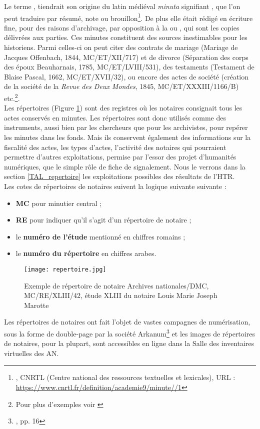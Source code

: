 Le terme , tiendrait son origine du latin médiéval \textit{minuta} signifiant , que l'on peut traduire par résumé, note ou brouillon\footnote{, CNRTL (Centre national des ressources textuelles et lexicales), URL : \url{https://www.cnrtl.fr/definition/academie9/minute//1}}. De plus elle était rédigé en écriture fine, pour des raisons d'archivage, par opposition à la  ou , qui sont les copies délivrées aux parties. Ces minutes constituent des sources inestimables pour les historiens. Parmi celles-ci on peut citer des contrats de mariage (Mariage de Jacques Offenbach, 1844, MC/ET/XII/717) et de divorce (Séparation des corps des époux Beauharnais, 1785, MC/ET/LVIII/531), des testaments (Testament de Blaise Pascal, 1662, MC/ET/XVII/32), ou encore des actes de société (création de la société de la \textit{Revue des Deux Mondes}, 1845, MC/ET/XXXIII/1166/B) etc.\footnote{Pour plus d'exemples voir \cite{limon-bonnet_122_2012}}.\\

Les répertoires (Figure \ref{fig:repertoire}) sont des registres où les notaires consignait tous les actes conservés en minutes. Les répertoires sont donc utilisés comme des instruments, aussi bien par les chercheurs que pour les archivistes, pour repérer les minutes dans les fonds. Mais ils conservent également des informations sur la fiscalité des actes, les types d'actes, l'activité des notaires qui pourraient permettre d'autres exploitations, permise par l'essor des projet d'humanités numériques, que le simple rôle de fiche de signalement. Nous le verrons dans la section \ref{TAL_repertoire} les exploitations possibles des résultats de l'HTR.\\

Les cotes de répertoires de notaires suivent la logique suivante suivante :
\begin{itemize}
    \item \textbf{MC} pour minutier central ;
    \item \textbf{RE} pour indiquer qu'il s'agit d'un répertoire de notaire ;
    \item le \textbf{numéro de l'étude} mentionné en chiffres romains ;
    \item le \textbf{numéro du répertoire} en chiffres arabes.
\end{itemize}

\newpage
\begin{figure}[h!]
    \centering
    \texttt{[image: repertoire.jpg]}
    \caption{Exemple de répertoire de notaire  \textcopyright Archives nationales/DMC, MC/RE/XLIII/42, étude XLIII du notaire Louis Marie Joseph Marotte}
    \label{fig:repertoire}
\end{figure}
\newpage
Les répertoires de notaires ont fait l'objet de vastes campagnes de numérisation, sous la forme de double-page par la société Arkanum\footnote{\cite{bonhomme_defis_2018}, pp. 16} et les images de répertoires de notaires, pour la plupart, sont accessibles en ligne dans la Salle des inventaires virtuelles des AN. \\

